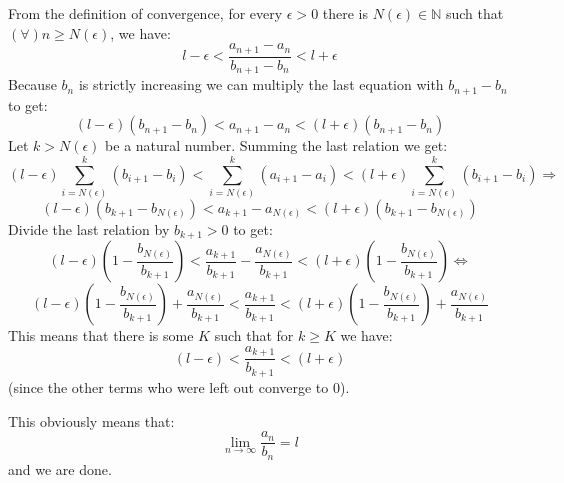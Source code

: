 \documentclass[12pt]{article}
\begin{document}
From the definition of convergence, for every $\epsilon > 0$ there is $N(\epsilon) \in \mathbb{N}$ such that $(\forall) n \geq N(\epsilon)$, we have:
$$ l-\epsilon < \frac{a_{n+1}-a_n}{b_{n+1}-b_n} < l + \epsilon $$
Because $b_n$ is strictly increasing we can multiply the last equation with $b_{n+1}-b_n$ to get:
$$ (l-\epsilon)(b_{n+1}-b_n) < a_{n+1}-a_n < (l+\epsilon)(b_{n+1}-b_n) $$
Let $k>N(\epsilon)$ be a natural number. Summing the last relation we get:
$$ (l-\epsilon)\sum_{i=N(\epsilon)}^{k}(b_{i+1}-b_i) < \sum_{i=N(\epsilon)}^{k}(a_{i+1}-a_i) < (l+\epsilon)\sum_{i=N(\epsilon)}^{k}(b_{i+1}-b_i) \Rightarrow $$
$$ (l-\epsilon)(b_{k+1}-b_{N(\epsilon)}) < a_{k+1} - a_{N(\epsilon)} < (l+\epsilon)(b_{k+1}-b_{N(\epsilon)})$$
Divide the last relation by $b_{k+1}>0$ to get:
$$ (l-\epsilon)(1 - \frac{b_{N(\epsilon)}}{b_{k+1}}) < \frac{a_{k+1}}{b_{k+1}} - \frac{a_{N(\epsilon)}}{b_{k+1}}<(l+\epsilon)(1 - \frac{b_{N(\epsilon)}}{b_{k+1}}) \Leftrightarrow$$
$$ (l-\epsilon)(1 - \frac{b_{N(\epsilon)}}{b_{k+1}}) + \frac{a_{N(\epsilon)}}{b_{k+1}}< \frac{a_{k+1}}{b_{k+1}}<(l+\epsilon)(1 - \frac{b_{N(\epsilon)}}{b_{k+1}}) + \frac{a_{N(\epsilon)}}{b_{k+1}} $$
This means that there is some $K$ such that for $k \geq K$ we have:
$$(l-\epsilon)<\frac{a_{k+1}}{b_{k+1}}< (l+\epsilon)$$
(since the other terms who were left out converge to 0).

This obviously means that:
$$ \lim_{n \rightarrow \infty} \frac{a_n}{b_n}=l$$
and we are done.
\end{document}
